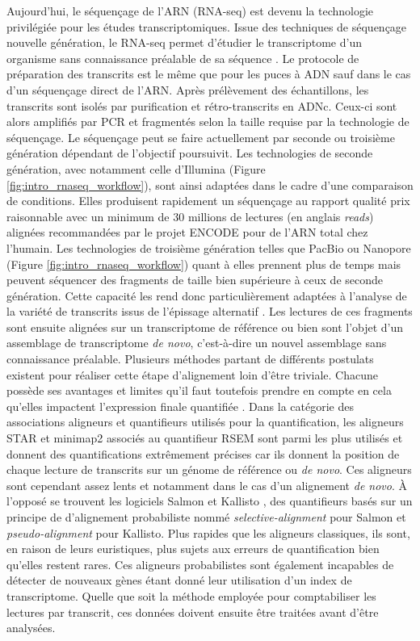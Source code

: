 Aujourd'hui, le séquençage de l'ARN (RNA-seq) est devenu la technologie privilégiée pour les études transcriptomiques. Issue des techniques de séquençage nouvelle génération, le RNA-seq permet d'étudier le transcriptome d'un organisme sans connaissance préalable de sa séquence \cite{Wang2009Jan}. Le protocole de préparation des transcrits est le même que pour les puces à ADN sauf dans le cas d'un séquençage direct de l'ARN. Après prélèvement des échantillons, les transcrits sont isolés par purification et rétro-transcrits en ADNc. Ceux-ci sont alors amplifiés par PCR et fragmentés selon la taille requise par la technologie de séquençage. Le séquençage peut se faire actuellement par seconde ou troisième génération dépendant de l'objectif poursuivit. Les technologies de seconde génération, avec notamment celle d'Illumina (Figure \ref{fig:intro_rnaseq_workflow}), sont ainsi adaptées dans le cadre d'une comparaison de conditions. Elles produisent rapidement un séquençage au rapport qualité prix raisonnable avec un minimum de 30 millions de lectures (en anglais \textit{reads}) alignées recommandées par le projet ENCODE \cite{ENCODE2012} pour de l'ARN total chez l'humain. Les technologies de troisième génération telles que PacBio ou Nanopore (Figure \ref{fig:intro_rnaseq_workflow}) quant à elles prennent plus de temps mais peuvent séquencer des fragments de taille bien supérieure à ceux de seconde génération. Cette capacité les rend donc particulièrement adaptées à l'analyse de la variété de transcrits issus de l'épissage alternatif \cite{Bergsma2018Jan}. Les lectures de ces fragments sont ensuite alignées sur un transcriptome de référence ou bien sont l'objet d'un assemblage de transcriptome \textit{de novo}, c’est-à-dire un nouvel assemblage sans connaissance préalable. Plusieurs méthodes partant de différents postulats existent pour réaliser cette étape d'alignement loin d'être triviale. Chacune possède ses avantages et limites qu'il faut toutefois prendre en compte en cela qu'elles impactent l'expression finale quantifiée \cite{Yi2018Oct,Srivastava2020Dec}. Dans la catégorie des associations aligneurs et quantifieurs utilisés pour la quantification, les aligneurs STAR \cite{Dobin2013Jan} et minimap2 \cite{Li2018Sep} associés au quantifieur RSEM \cite{Li2011Dec} sont parmi les plus utilisés et donnent des quantifications extrêmement précises car ils donnent la position de chaque lecture de transcrits sur un génome de référence ou \textit{de novo}. Ces aligneurs sont cependant assez lents et notamment dans le cas d'un alignement \textit{de novo}. À l'opposé se trouvent les logiciels Salmon \cite{Patro2017Apr} et Kallisto \cite{Bray2016May}, des quantifieurs basés sur un principe de d'alignement probabiliste nommé \textit{selective-alignment} pour Salmon et \textit{pseudo-alignment} pour Kallisto. Plus rapides que les aligneurs classiques, ils sont, en raison de leurs euristiques, plus sujets aux erreurs de quantification bien qu'elles restent rares. Ces aligneurs probabilistes sont également incapables de détecter de nouveaux gènes étant donné leur utilisation d'un index de transcriptome. Quelle que soit la méthode employée pour comptabiliser les lectures par transcrit, ces données doivent ensuite être traitées avant d'être analysées.


